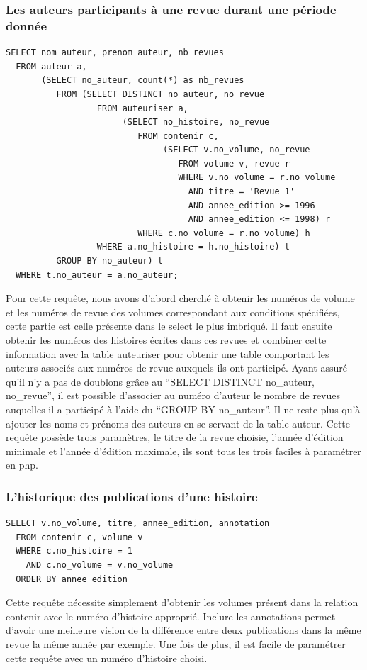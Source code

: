 \documentclass[12pt]{article}
\begin{document}
\subsubsection*{Les auteurs participants à une revue durant une période
donnée}
\begin{lstlisting}
SELECT nom_auteur, prenom_auteur, nb_revues
  FROM auteur a,
       (SELECT no_auteur, count(*) as nb_revues
          FROM (SELECT DISTINCT no_auteur, no_revue
                  FROM auteuriser a,
                       (SELECT no_histoire, no_revue
                          FROM contenir c,
                               (SELECT v.no_volume, no_revue
                                  FROM volume v, revue r
                                  WHERE v.no_volume = r.no_volume
                                    AND titre = 'Revue_1'
                                    AND annee_edition >= 1996
                                    AND annee_edition <= 1998) r
                          WHERE c.no_volume = r.no_volume) h
                  WHERE a.no_histoire = h.no_histoire) t
          GROUP BY no_auteur) t
  WHERE t.no_auteur = a.no_auteur;
\end{lstlisting}
Pour cette requête, nous avons d'abord cherché à obtenir les numéros de
volume et les numéros de revue des volumes correspondant aux conditions
spécifiées, cette partie est celle présente dans le select le plus imbriqué.
Il faut ensuite obtenir les numéros des histoires écrites dans ces revues et
combiner cette information avec la table auteuriser pour obtenir une table
comportant les auteurs associés aux numéros de revue auxquels ils ont
participé. Ayant assuré qu'il n'y a pas de doublons grâce au
``SELECT DISTINCT no\_auteur, no\_revue'', il est possible d'associer au
numéro d'auteur le nombre de revues auquelles il a participé à l'aide du
``GROUP BY no\_auteur''. Il ne reste plus qu'à ajouter les noms et prénoms
des auteurs en se servant de la table auteur. Cette requête possède trois
paramètres, le titre de la revue choisie, l'année d'édition minimale et
l'année d'édition maximale, ils sont tous les trois faciles à paramétrer en
php.

\subsubsection*{L'historique des publications d'une histoire}
\begin{lstlisting}
SELECT v.no_volume, titre, annee_edition, annotation
  FROM contenir c, volume v
  WHERE c.no_histoire = 1
    AND c.no_volume = v.no_volume
  ORDER BY annee_edition
\end{lstlisting}
Cette requête nécessite simplement d'obtenir les volumes présent dans la
relation contenir avec le numéro d'histoire approprié. Inclure les
annotations permet d'avoir une meilleure vision de la différence entre deux
publications dans la même revue la même année par exemple. Une fois de plus,
il est facile de paramétrer cette requête avec un numéro d'histoire choisi.
\end{document}
